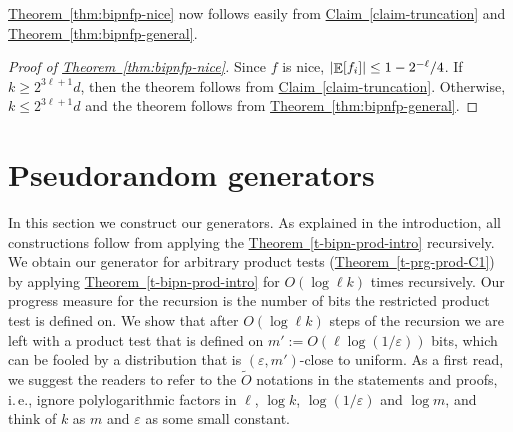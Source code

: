 \documentclass[11pt]{article}
\numberwithin{equation}{section}
\theoremstyle{definition}
\theoremstyle{plain}
\newcommand{\ie}{i.\,e.}
\newcommand{\expref}[2]{\hyperref[#2]{#1~\ref{#2}}}
\def\eps{\varepsilon}
\def\Blocklength{\ell}
\DeclarePairedDelimiter{\abs}{\lvert}{\rvert}
\DeclareMathOperator*{\E}{\mathbb{E}}                 %
\begin{document}
	\expref{Theorem}{thm:bipnfp-nice} now follows easily from \expref{Claim}{claim-truncation} and \expref{Theorem}{thm:bipnfp-general}.

  \begin{proof}[Proof of {\expref{Theorem}{thm:bipnfp-nice}}]
		Since $f$ is nice, $\abs{\E[f_i]} \le 1 - 2^{-\Blocklength}/4$.
    If $k \ge 2^{3\Blocklength+1} d$, then the theorem follows from \expref{Claim}{claim-truncation}.
    Otherwise, $k \le 2^{3\Blocklength+1} d$ and the theorem follows from \expref{Theorem}{thm:bipnfp-general}.
  \end{proof}



  \section{Pseudorandom generators} \label{sec:prg}
	In this section we construct our generators.
  As explained in the introduction, all constructions follow from applying the \expref{Theorem}{t-bipn-prod-intro} recursively.
  We obtain our generator for arbitrary product tests (\expref{Theorem}{t-prg-prod-C1}) by applying \expref{Theorem}{t-bipn-prod-intro} for $O(\log \Blocklength k)$ times recursively.
  Our progress measure for the recursion is the number of bits the restricted product test is defined on.
  We show that after $O(\log \Blocklength k)$ steps of the recursion we are left with a product test that is defined on $m' := O(\Blocklength \log(1/\eps))$ bits, which can be fooled by a distribution that is $(\eps, m')$-close to uniform.
  As a first read, we suggest the readers to refer to the $\tilde O$ notations in the statements and proofs, \ie, ignore polylogarithmic factors in $\Blocklength$, $\log k$, $\log(1/\eps)$ and $\log m$, and think of $k$ as $m$ and $\eps$ as some small constant.
\end{document}
